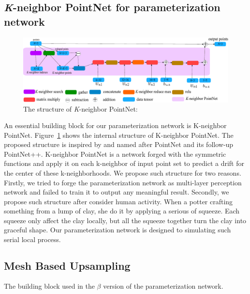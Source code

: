 \subsection{ \textit{K}-neighbor PointNet for parameterization network} 
\label{subsec:k-n_point_net}
\begin{figure}[htbp]
	\centering
	\includegraphics[width=\linewidth]{img/net/k-n_pointnet}
	\caption{The structure of \textit{K}-neighbor PointNet: }
	\label{fig:knpointnet}
\end{figure}
An essential building block for our parameterization network is K-neighbor PointNet. Figure~\ref{fig:knpointnet} shows the internal structure of K-neighbor PointNet. The proposed structure is inspired by and named after PointNet\citep{PointNet} and its follow-up PointNet++\citep{NIPS2017_7095}. K-neighbor PointNet is a network forged with the symmetric functions and apply it on each k-neighbor of input point set to predict a drift for the center of these k-neighborhoods. We propose such structure for two reasons. Firstly, we tried to forge the parameterization network as multi-layer perception network and failed to train it to output any meaningful result. Secondly, we propose such structure after consider human activity. When a potter crafting something from a lump of clay, she do it by applying a serious of squeeze. Each squeeze only affect the clay locally, but all the squeeze together turn the clay into graceful shape. Our parameterization network is designed to simulating such serial local process. 
\subsection{Mesh Based Upsampling}
The building block used in the $\beta$ version of the parameterization network.
